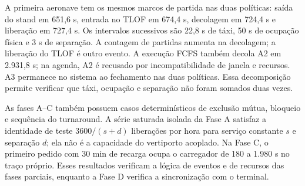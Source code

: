 A primeira aeronave tem os mesmos marcos de partida nas duas políticas: saída do stand em 651,6 s, entrada no TLOF em 674,4 s, decolagem em 724,4 s e liberação em 727,4 s. Os intervalos sucessivos são 22,8 s de táxi, 50 s de ocupação física e 3 s de separação. A contagem de partidas aumenta na decolagem; a liberação do TLOF é outro evento. A execução FCFS também decola A2 em 2.931,8 s; na agenda, A2 é recusado por incompatibilidade de janela e recursos. A3 permanece no sistema ao fechamento nas duas políticas. Essa decomposição permite verificar que táxi, ocupação e separação não foram somados duas vezes.

As fases A--C também possuem casos determinísticos de exclusão mútua, bloqueio e sequência do turnaround. A série saturada isolada da Fase A satisfaz a identidade de teste $3600/(s+d)$ liberações por hora para serviço constante $s$ e separação $d$; ela não é a capacidade do vertiporto acoplado. Na Fase C, o primeiro pedido com 30 min de recarga ocupa o carregador de 180 a 1.980 s no traço próprio. Esses resultados verificam a lógica de eventos e de recursos das fases parciais, enquanto a Fase D verifica a sincronização com o terminal.
